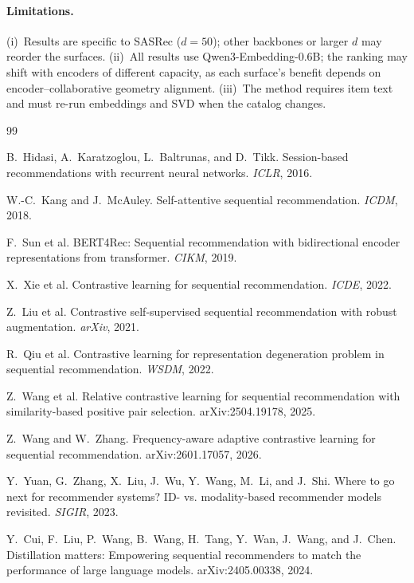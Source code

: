 \documentclass{article}
\begin{document}
\paragraph{Limitations.}
(i)~Results are specific to SASRec ($d{=}50$); other backbones or
larger $d$ may reorder the surfaces.
(ii)~All results use Qwen3-Embedding-0.6B; the ranking may shift
with encoders of different capacity, as each surface's benefit
depends on encoder--collaborative geometry alignment.
(iii)~The method requires item text and must re-run embeddings and
SVD when the catalog changes.

{\small
\begin{thebibliography}{99}

B.~Hidasi, A.~Karatzoglou, L.~Baltrunas, and D.~Tikk.
Session-based recommendations with recurrent neural networks.
\emph{ICLR}, 2016.

W.-C.~Kang and J.~McAuley.
Self-attentive sequential recommendation.
\emph{ICDM}, 2018.

F.~Sun et al.
BERT4Rec: Sequential recommendation with bidirectional encoder
representations from transformer.
\emph{CIKM}, 2019.

X.~Xie et al.
Contrastive learning for sequential recommendation.
\emph{ICDE}, 2022.

Z.~Liu et al.
Contrastive self-supervised sequential recommendation with robust augmentation.
\emph{arXiv}, 2021.

R.~Qiu et al.
Contrastive learning for representation degeneration problem in sequential recommendation.
\emph{WSDM}, 2022.

Z.~Wang et al.
Relative contrastive learning for sequential recommendation with
similarity-based positive pair selection.
arXiv:2504.19178, 2025.

Z.~Wang and W.~Zhang.
Frequency-aware adaptive contrastive learning for sequential
recommendation.
arXiv:2601.17057, 2026.

Y.~Yuan, G.~Zhang, X.~Liu, J.~Wu, Y.~Wang, M.~Li, and J.~Shi.
Where to go next for recommender systems? ID- vs. modality-based
recommender models revisited.
\emph{SIGIR}, 2023.

Y.~Cui, F.~Liu, P.~Wang, B.~Wang, H.~Tang, Y.~Wan, J.~Wang, and
J.~Chen.
Distillation matters: Empowering sequential recommenders to match
the performance of large language models.
arXiv:2405.00338, 2024.


\end{thebibliography}}
\end{document}
